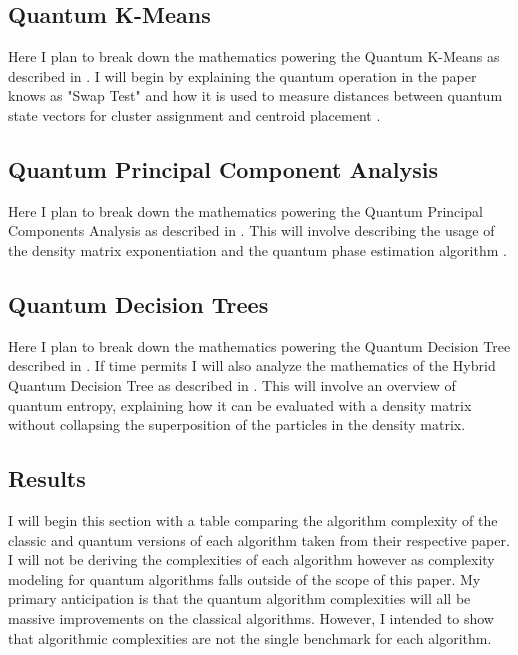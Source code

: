 \documentclass[conference]{IEEEtran}
\begin{document}
\subsection{Quantum K-Means}
Here I plan to break down the mathematics powering the Quantum K-Means as described in \cite{b6}. I will begin by explaining the quantum operation in the paper knows as "Swap Test" and how it is used to measure distances between quantum state vectors for cluster assignment and centroid placement \cite{b6}.
\subsection{Quantum Principal Component Analysis}
Here I plan to break down the mathematics powering the Quantum Principal Components Analysis as described in \cite{b7}. This will involve describing the usage of the density matrix exponentiation and the quantum phase estimation algorithm \cite{b7}.
\subsection{Quantum Decision Trees}
Here I plan to break down the mathematics powering the Quantum Decision Tree described in \cite{b13}. If time permits I will also analyze the mathematics of the Hybrid Quantum Decision Tree as described in \cite{b14}. This will involve an overview of quantum entropy, explaining how it can be evaluated with a density matrix without collapsing the superposition of the particles in the density matrix. 


\subsection{Results}
I will begin this section with a table comparing the algorithm complexity of the classic and quantum versions of each algorithm taken from their respective paper. I will not be deriving the complexities of each algorithm however as complexity modeling for quantum algorithms falls outside of the scope of this paper. My primary anticipation is that  the quantum algorithm complexities will all be massive improvements on the classical algorithms. However, I intended to show that algorithmic complexities are not the single benchmark for each algorithm. 
\end{document}
